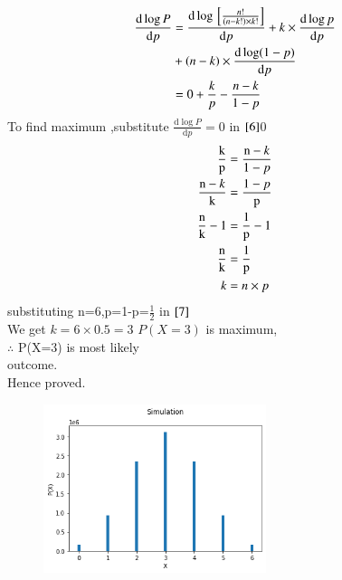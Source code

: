 \documentclass[journal,12pt,twocolumn]{IEEEtran}
\begin{document}
\begin{align}
\frac{\mathrm{d} \log P}{\mathrm{d} p}&=\frac{\mathrm{d} \log {}\left[\frac{n!}{(n-k!)\times k!}\right]}{\mathrm{d}p}+k\times  \frac{\mathrm{d}\log p}{\mathrm{d} p} \\
     &+(n-k) \times \frac{\mathrm{d}\log (1-p)}{\mathrm{d} p} \notag \\
     &=0+\frac{k}{p}-\frac{n-k}{1-p} \label{6}
\end{align}
To find maximum ,substitute $\frac{\mathrm{d} \log P}{\mathrm{d} p}=0$ in $\eqref{6}$0
\begin{align}
\frac{\mbox k}{\mbox p}&=\frac{\mbox n-k}{\mbox 1-p}  \\
\frac{\mbox n-k}{\mbox k}&=\frac{\mbox 1-p}{\mbox p}  \\
\frac{\mbox n}{\mbox k}-1&=\frac{\mbox 1}{\mbox p}-1  \\
\frac{\mbox n}{\mbox k}&=\frac{\mbox 1}{\mbox p}  \\
k&=n\times p \label{7}
\end{align}
substituting n=6,p=1-p=$\frac{1}{2}$ in $\eqref{7}$\\
We get $k=6\times 0.5=3$
$P(X=3)$ is maximum,\\
$\therefore$ P(X=3) is most likely \\
outcome.\\
Hence proved.

\begin{figure}
\begin{center}
\includegraphics[width=0.58\textwidth]{assignment1.png}
\end{center}
\end{figure}
\end{document}

